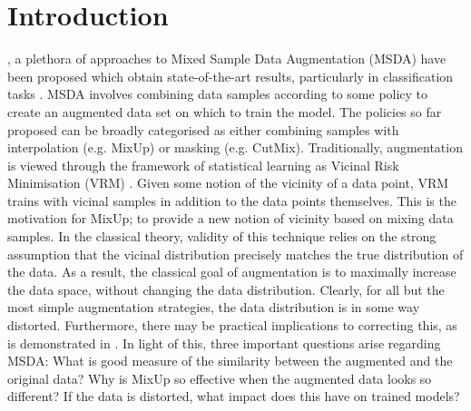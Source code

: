 \documentclass[journal]{IEEEtran}
\newcommand{\mixup}{MixUp\xspace}
\newcommand{\cutmix}{CutMix\xspace}
\begin{document}
\IEEEpeerreviewmaketitle



\section{Introduction}

, a plethora of approaches to Mixed Sample Data Augmentation (MSDA) have been proposed
which obtain state-of-the-art results, particularly in classification tasks \citep{chawla2002smote,zhang2017mixup,tokozume2017learning,tokozume2018between,inoue2018data,yun2019cutmix,takahashi2019data,summers2019improved, kim2020puzzle, walawalkar2020attentive, uddin2020saliencymix}.
MSDA involves combining data samples according to some policy to create an augmented data set on which to train the model.
The policies so far proposed can be broadly categorised as either combining samples with interpolation (e.g. \mixup) or masking (e.g. \cutmix).
Traditionally, augmentation is viewed through the framework of statistical learning as Vicinal Risk Minimisation (VRM) \citep{vapnik2013nature, chapelle2001vicinal}. Given some notion of the vicinity of a data point, VRM trains with vicinal samples in addition to the data points themselves. This is the motivation for \mixup \citep{zhang2017mixup}; to provide a new notion of vicinity based on mixing data samples.
In the classical theory, validity of this technique relies on the strong assumption that the vicinal distribution precisely matches the true distribution of the data. As a result, the classical goal of augmentation is to maximally increase the data space, without changing the data distribution.
Clearly, for all but the most simple augmentation strategies, the data distribution is in some way distorted. Furthermore, there may be practical implications to correcting this, as is demonstrated in \citet{touvron2019fixing}.
In light of this, three important questions arise regarding MSDA: What is good measure of the similarity between the augmented and the original data? Why is \mixup so effective when the augmented data looks so different? If the data is distorted, what impact does this have on trained models?
\end{document}
